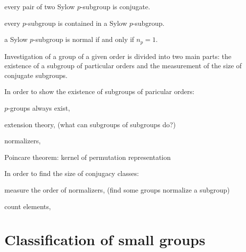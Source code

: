 \documentclass{../note}
\begin{document}
\begin{parts}
\item every pair of two Sylow $p$-subgroup is conjugate.
\item every $p$-subgroup is contained in a Sylow $p$-subgroup.
\item a Sylow $p$-subgroup is normal if and only if $n_p=1$.
\end{parts}

Investigation of a group of a given order is divided into two main parts: the existence of a subgroup of particular orders and the measurement of the size of conjugate subgroups.

In order to show the existence of subgroups of paricular orders:
\begin{parts}
\item $p$-groups always exist,
\item extension theory, (what can subgroups of subgroups do?)
\item normalizers,
\item Poincare theorem: kernel of permutation representation
\end{parts}

In order to find the size of conjugacy classes:
\begin{parts}
\item measure the order of normalizers, (find some groups normalize a subgroup)
\item count elements,
\end{parts}



\section{Classification of small groups}

\begin{prb}
\end{prb}

\begin{prb}
\end{prb}

\begin{prb}
\end{prb}
\end{document}
